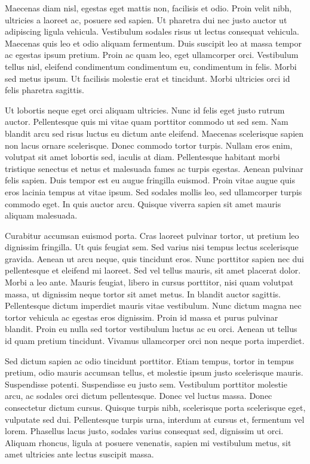 Maecenas diam nisl, egestas eget mattis non, facilisis et odio.
Proin velit nibh, ultricies a laoreet ac, posuere sed sapien.
Ut pharetra dui nec justo auctor ut adipiscing ligula vehicula.
Vestibulum sodales risus ut lectus consequat vehicula.
Maecenas quis leo et odio aliquam fermentum.
Duis suscipit leo at massa tempor ac egestas ipsum pretium.
Proin ac quam leo, eget ullamcorper orci.
Vestibulum tellus nisl, eleifend condimentum condimentum eu, condimentum in felis.
Morbi sed metus ipsum.
Ut facilisis molestie erat et tincidunt.
Morbi ultricies orci id felis pharetra sagittis.

Ut lobortis neque eget orci aliquam ultricies.
Nunc id felis eget justo rutrum auctor.
Pellentesque quis mi vitae quam porttitor commodo ut sed sem.
Nam blandit arcu sed risus luctus eu dictum ante eleifend.
Maecenas scelerisque sapien non lacus ornare scelerisque.
Donec commodo tortor turpis.
Nullam eros enim, volutpat sit amet lobortis sed, iaculis at diam.
Pellentesque habitant morbi tristique senectus et netus et malesuada fames ac turpis egestas.
Aenean pulvinar felis sapien.
Duis tempor est eu augue fringilla euismod.
Proin vitae augue quis eros lacinia tempus at vitae ipsum.
Sed sodales mollis leo, sed ullamcorper turpis commodo eget.
In quis auctor arcu.
Quisque viverra sapien sit amet mauris aliquam malesuada.

Curabitur accumsan euismod porta.
Cras laoreet pulvinar tortor, ut pretium leo dignissim fringilla.
Ut quis feugiat sem.
Sed varius nisi tempus lectus scelerisque gravida.
Aenean ut arcu neque, quis tincidunt eros.
Nunc porttitor sapien nec dui pellentesque et eleifend mi laoreet.
Sed vel tellus mauris, sit amet placerat dolor.
Morbi a leo ante.
Mauris feugiat, libero in cursus porttitor, nisi quam volutpat massa, ut dignissim neque tortor sit amet metus.
In blandit auctor sagittis.
Pellentesque dictum imperdiet mauris vitae vestibulum.
Nunc dictum magna nec tortor vehicula ac egestas eros dignissim.
Proin id massa et purus pulvinar blandit.
Proin eu nulla sed tortor vestibulum luctus ac eu orci.
Aenean ut tellus id quam pretium tincidunt.
Vivamus ullamcorper orci non neque porta imperdiet.

Sed dictum sapien ac odio tincidunt porttitor.
Etiam tempus, tortor in tempus pretium, odio mauris accumsan tellus, et molestie ipsum justo scelerisque mauris.
Suspendisse potenti.
Suspendisse eu justo sem.
Vestibulum porttitor molestie arcu, ac sodales orci dictum pellentesque.
Donec vel luctus massa.
Donec consectetur dictum cursus.
Quisque turpis nibh, scelerisque porta scelerisque eget, vulputate sed dui.
Pellentesque turpis urna, interdum at cursus et, fermentum vel lorem.
Phasellus lacus justo, sodales varius consequat sed, dignissim ut orci.
Aliquam rhoncus, ligula at posuere venenatis, sapien mi vestibulum metus, sit amet ultricies ante lectus suscipit massa.

